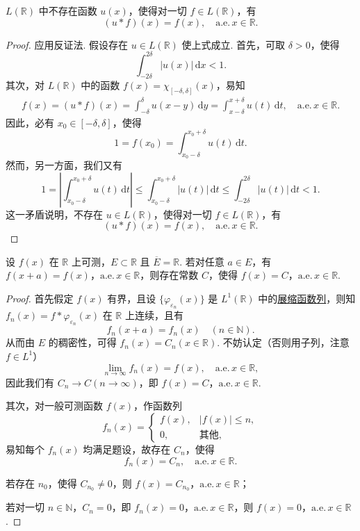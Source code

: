 \documentclass[../../main.tex]{subfiles}
\begin{document}
\begin{proposition}[\( L \) 中无卷积单位]\label{proposition:L中无卷积单位}
\( L(\mathbb{R}) \) 中不存在函数 \( u(x) \)，使得对一切 \( f \in L(\mathbb{R}) \)，有
\[
(u * f)(x) = f(x), \quad \text{a.e.}\, x \in \mathbb{R}.
\]
\end{proposition}
\begin{proof}
应用反证法. 假设存在 \( u \in L(\mathbb{R}) \) 使上式成立. 首先，可取 \( \delta > 0 \)，使得
\[
\int_{-2\delta}^{2\delta} |u(x)| \, \mathrm{d}x < 1.
\]
其次，对 \( L(\mathbb{R}) \) 中的函数 \( f(x) = \chi_{[-\delta, \delta]}(x) \)，易知
\begin{align*}
f(x) = (u * f)(x) = \int_{-\delta}^{\delta} u(x - y) \, \mathrm{d}y = \int_{x - \delta}^{x + \delta} u(t) \, \mathrm{d}t, \quad \text{a.e.}\, x \in \mathbb{R}.
\end{align*}
因此，必有 \( x_0 \in [-\delta, \delta] \)，使得
\[
1 = f(x_0) = \int_{x_0 - \delta}^{x_0 + \delta} u(t) \, \mathrm{d}t.
\]
然而，另一方面，我们又有
\[
1 = \left| \int_{x_0 - \delta}^{x_0 + \delta} u(t) \, \mathrm{d}t \right| \leq \int_{x_0 - \delta}^{x_0 + \delta} |u(t)| \, \mathrm{d}t \leq \int_{-2\delta}^{2\delta} |u(t)| \, \mathrm{d}t < 1.
\]
这一矛盾说明，不存在 \( u \in L(\mathbb{R}) \)，使得对一切 \( f \in L(\mathbb{R}) \)，有
\[
(u * f)(x) = f(x), \quad \text{a.e.}\, x \in \mathbb{R}.
\]
\end{proof}

\begin{example}
设 \( f(x) \) 在 \( \mathbb{R} \) 上可测，\( E \subset \mathbb{R} \) 且 \( \overline{E} = \mathbb{R} \). 若对任意 \( a \in E \)，有 \( f(x + a) = f(x) \)，\(\text{a.e.}\, x \in \mathbb{R} \)，则存在常数 \( C \)，使得 \( f(x) = C \)，\(\text{a.e.}\, x \in \mathbb{R} \).
\end{example}
\begin{proof}
首先假定 \( f(x) \) 有界，且设 \( \{ \varphi_{\varepsilon_n}(x) \} \) 是 \( L^1(\mathbb{R}) \) 中的\hyperref[definition:展缩函数]{展缩函数列}，则知 \( f_n(x) = f * \varphi_{\varepsilon_n}(x) \) 在 \( \mathbb{R} \) 上连续，且有
\[
f_n(x + a) = f_n(x) \quad (n \in \mathbb{N}).
\]
从而由 \( E \) 的稠密性，可得 \( f_n(x) = C_n (x \in \mathbb{R}) \). 不妨认定（否则用子列，注意 \( f \in L^1 \)）
\[
\lim_{n \to \infty} f_n(x) = f(x), \quad \text{a.e.}\, x \in \mathbb{R},
\]
因此我们有 \( C_n \to C (n \to \infty) \)，即 \( f(x) = C \)，\(\text{a.e.}\, x \in \mathbb{R} \).

其次，对一般可测函数 \( f(x) \)，作函数列
\[
f_n(x) = 
\begin{cases} 
f(x), & |f(x)| \leq n, \\
0, & \text{其他},
\end{cases}
\]
易知每个 \( f_n(x) \) 均满足题设，故存在 \( C_n \)，使得
\[
f_n(x) = C_n, \quad \text{a.e.}\, x \in \mathbb{R}.
\]

若存在 \( n_0 \)，使得 \( C_{n_0} \neq 0 \)，则 \( f(x) = C_{n_0} \)，\(\text{a.e.}\, x \in \mathbb{R} \)；

若对一切 \( n \in \mathbb{N} \)，\( C_n = 0 \)，即 \( f_n(x) = 0 \)，\(\text{a.e.}\, x \in \mathbb{R} \)，则 \( f(x) = 0 \)，\(\text{a.e.}\, x \in \mathbb{R} \).
\end{proof}
\end{document}
